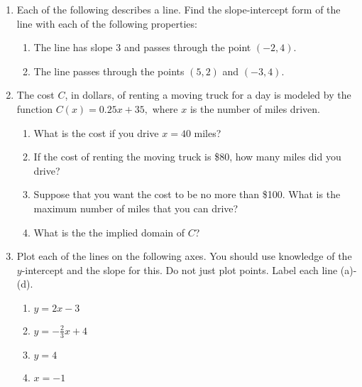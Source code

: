 \documentclass{article}
\providecommand{\tightlist}{%
  \setlength{\itemsep}{0pt}\setlength{\parskip}{0pt}}
\begin{document}
\begin{enumerate}
\item Each of the following describes a line. Find the slope-intercept form of
the line with each of the following properties:

\begin{enumerate}
\def\labelenumi{\arabic{enumi}.}
\item
  The line has slope 3 and passes through the point \((-2,4)\).
\item
  The line passes through the points \((5,2)\) and \((-3,4)\).
\end{enumerate}
\item The cost \(C\), in dollars, of renting a moving truck for a day is
modeled by the function \(C(x)=0.25x+35,\) where \(x\) is the number of
miles driven.

\begin{enumerate}
\def\labelenumi{\arabic{enumi}.}
\tightlist
\item
  What is the cost if you drive \(x=40\) miles?
\item
  If the cost of renting the moving truck is \$80, how many miles did
  you drive?
\item
  Suppose that you want the cost to be no more than \$100. What is the
  maximum number of miles that you can drive?
\item
  What is the the implied domain of \(C\)?
\end{enumerate}
\item Plot each of the lines on the following axes. You should use knowledge
of the \(y\)-intercept and the slope for this. Do not just plot points.
Label each line (a)-(d).

\begin{enumerate}
\def\labelenumi{\arabic{enumi}.}
\tightlist
\item
  \(y=2x-3\)
\item
  \(y=-\frac{2}{3}x + 4 \)
\item
  \(y=4\)
\item
  \(x=-1\)
\end{enumerate}

\end{enumerate}
\end{document}

